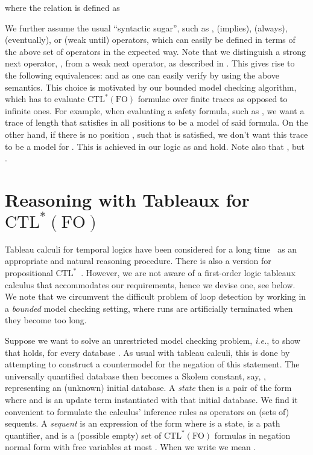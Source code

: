 \documentclass{llncs}
\newcommand{\ie}{\textit{i.e.}}
\newcommand{\CTLs}{\ensuremath{\text{CTL}^\ast}\xspace}
\newcommand{\CTLsFO}{\ensuremath{\text{CTL}^\ast(\text{FO})}\xspace}
\begin{document}
{where the relation  is defined as

We further assume the usual ``syntactic sugar'', such as ,
 (implies),  (always),  (eventually), or
 (weak until) operators, which can easily be defined in terms of
the above set of operators in the expected way.
Note that we distinguish a strong next operator, , from a weak
next operator,  as described in
\cite{bauer:leucker:schallhart:jlc10}.  This gives rise to the following
equivalences:  and  as one can easily verify by using the above semantics.  This
choice is motivated by our bounded model checking algorithm, which has
to evaluate \CTLsFO formulae over finite traces as opposed to infinite
ones.  For example, when evaluating a safety formula, such as
, we want a trace of length  that satisfies  in all
positions  to be a model of said formula.  On the other hand,
if there is no position , such that  is satisfied, we
don't want this trace to be a model for .  This is achieved
in our logic as  and  hold.  Note also that , but .


\section{Reasoning with Tableaux for \CTLsFO}
\label{sec:ctlsfo-tableaux}
Tableau calculi for temporal logics have been considered for a long
time~\cite[e.g.]{gore-tableau-methods} as an appropriate and natural reasoning
procedure. There is also a version for propositional
\CTLs~\cite{DBLP:conf/fm/Reynolds09}. However, we are not aware of a first-order
logic tableaux calculus that accommodates our requirements, hence we devise one, see
below. We note that we circumvent the difficult problem of loop detection by working
in a \emph{bounded} model checking setting, where runs are artificially terminated
when they become too long.

Suppose we want to solve an unrestricted model checking problem, \ie, to show that
 holds, for every database . As usual with tableau
calculi, this is done by attempting to construct a countermodel for the negation of this
statement. The universally quantified database  then becomes a Skolem
constant, say, , representing an (unknown) initial database.
A \emph{state} then is a pair of the form  where  and  is an update term instantiated with that initial database. We
find it convenient to formulate the calculus' inference rules as operators on (sets
of) sequents. A \emph{sequent} is an expression of the form
 where  is a state,  is a path quantifier, and  is
a (possible empty) set of \CTLsFO formulas in negation normal form with free variables at most
. When we write  we mean .

}
\end{document}
